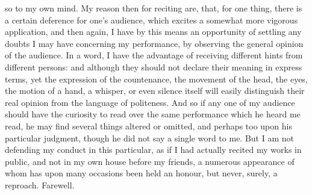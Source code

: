 so to my own mind. My reason then for reciting are, that, for one thing,
there is a certain deference for one's audience, which excites a somewhat
more vigorous application, and then again, I have by this means an
opportunity of settling any doubts I may have concerning my performance,
by observing the general opinion of the audience. In a word, I have the
advantage of receiving different hints from different persons: and
although they should not declare their meaning in express terms, yet the
expression of the countenance, the movement of the head, the eyes, the
motion of a hand, a whisper, or even silence itself will easily
distinguish their real opinion from the language of politeness. And so if
any one of my audience should have the curiosity to read over the same
performance which he heard me read, he may find several things altered or
omitted, and perhaps too upon his particular judgment, though he did not
say a single word to me. But I am not defending my conduct in this
particular, as if I had actually recited my works in public, and not in my
own house before my friends, a numerous appearance of whom has upon many
occasions been held an honour, but never, surely, a reproach. Farewell.


